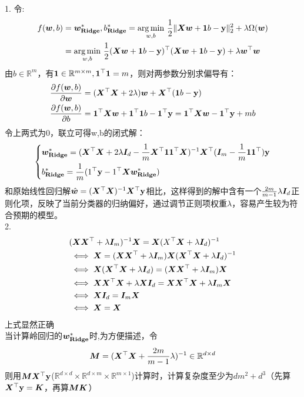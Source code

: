 \documentclass[answers]{exam}  %
\begin{document}
\begin{questions}
\begin{solution}
		1.
		令:
		$$\begin{aligned}
		f(\vw, b)
		&=\vw^*_{\mathbf{Ridge}},b^*_{\mathbf{Ridge}}=\underset{w,b}{\arg\min}\ \frac12 \| \mX \vw + \ones b-\mathbf{y} \|^2_2+\lambda\Omega(\vw) 
		\\&=\underset{w,b}{\arg\min}\ \frac12(\mX\vw+\ones b-\mathbf y)^\top (\mX\vw+\ones b-\mathbf y)+\lambda \vw^\top\vw
		\end{aligned}$$
		由$b\in\mathbb R^m$，有$\boldsymbol{1}\in\mathbb R^{m\times m},\boldsymbol{1}^\top\boldsymbol{1} = m$，则对两参数分别求偏导有：
		$$\begin{aligned}
			&\frac{\partial f(\boldsymbol{w},b)}{\partial \boldsymbol{w}}=(\boldsymbol{X}^\top \boldsymbol{X}+2\lambda)\boldsymbol{w}+\boldsymbol{X}^\top (\boldsymbol{1} b-\mathbf y)\\
			&\frac{\partial f(\boldsymbol{w},b)}{\partial b}=\boldsymbol{1}^\top\boldsymbol{X}\boldsymbol{w}+\boldsymbol{1}^\top\boldsymbol{1} b-\boldsymbol{1}^\top \mathbf y=\boldsymbol{1}^\top\boldsymbol{X}\boldsymbol{w}-\boldsymbol{1}^\top\mathbf y +mb
		\end{aligned}$$
		令上两式为0，联立可得w,b的闭式解：
		$$\left\{\begin{aligned}
			&\boldsymbol{w}^*_{\mathbf{Ridge}}=(\boldsymbol{X}^\top \boldsymbol{X}+2\lambda\boldsymbol{I}_d-\frac1m\boldsymbol{X}^\top\boldsymbol{1}\boldsymbol{1}^\top\boldsymbol{X})^{-1}\boldsymbol{X}^\top(\boldsymbol{I}_m-\frac1m\boldsymbol{1}\boldsymbol{1}^\top) \mathbf y\\
			&b^*_{\mathbf{Ridge}}=\frac1m(1^\top\mathbf y-1^\top\boldsymbol{X}\boldsymbol{w}^*_{\mathbf{Ridge}})
			\end{aligned}\right. $$
		和原始线性回归解$\hat{\boldsymbol{w}}=(\boldsymbol{X}^\top\boldsymbol{X})^{-1}\boldsymbol{X}^\top\mathbf y$相比，这样得到的解中含有一个$\frac{2m}{m-1}\lambda\boldsymbol{I}_d$正则化项，反映了当前分类器的归纳偏好，通过调节正则项权重$\lambda$，容易产生较为符合预期的模型。
		\\2.
	    $$
		\begin{aligned}
			&(\boldsymbol{X}\boldsymbol{X}^\top+\lambda \boldsymbol{I}_m)^{-1}\boldsymbol{X}=\boldsymbol{X}(X^\top \boldsymbol{X}+\lambda \boldsymbol{I}_d)^{-1}\\
			&\iff \boldsymbol{X}=(\boldsymbol{X}\boldsymbol{X}^\top+\lambda \boldsymbol{I}_m)\boldsymbol{X}(\boldsymbol{X}^\top \boldsymbol{X}+\lambda \boldsymbol{I}_d)^{-1}\\
			&\iff \boldsymbol{X}(\boldsymbol{X}^\top \boldsymbol{X}+\lambda \boldsymbol{I}_d)=(\boldsymbol{X}\boldsymbol{X}^\top+\lambda \boldsymbol{I}_m)\boldsymbol{X}\\
			&\iff \boldsymbol{X}\boldsymbol{X}^\top\boldsymbol{X} +\lambda\boldsymbol{X} \boldsymbol{I}_d=\boldsymbol{X}\boldsymbol{X}^\top \boldsymbol{X}+\lambda \boldsymbol{I}_m \boldsymbol{X}\\
			&\iff \boldsymbol{X} \boldsymbol{I}_d=\boldsymbol{I}_m\boldsymbol{X}\\
			&\iff \boldsymbol{X}=\boldsymbol{X}\
		\end{aligned}
		$$
		上式显然正确\\
		当计算岭回归的$\boldsymbol{w}^*_{\mathbf{Ridge}}$时,为方便描述，令
		$$\boldsymbol{M}=(\boldsymbol{X}^\top \boldsymbol{X}+\frac{2m}{m-1}\lambda)^{-1}\in\mathbb R^{d\times d}$$
		则用$\boldsymbol{M}\boldsymbol{X}^\top\mathbf y$($\mathbb R^{d\times d}\times \mathbb R^{d\times m}\times \mathbb R^{m\times 1}$)计算时，计算复杂度至少为$dm^2+d^3$（先算$\boldsymbol{X}^\top \mathbf y= \boldsymbol{K} $，再算$\boldsymbol{M} \boldsymbol{K}$）\\

\end{solution}
\end{questions}
\end{document}
